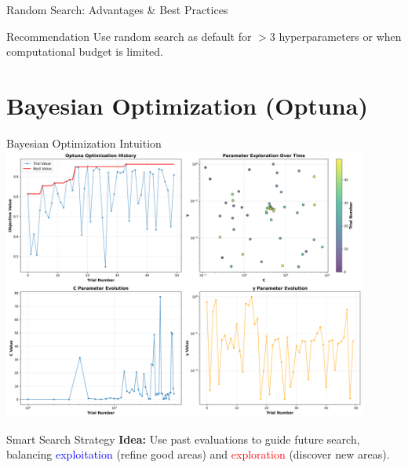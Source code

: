 \documentclass[8pt,aspectratio=1610]{beamer}
\begin{document}
\begin{frame}{Random Search: Advantages \& Best Practices}
\begin{alertblock}{Recommendation}
Use random search as default for $> 3$ hyperparameters or when computational budget is limited.
\end{alertblock}
\end{frame}


\section{Bayesian Optimization (Optuna)}

\begin{frame}{Bayesian Optimization Intuition}
\centering
\includegraphics[width=0.9\textwidth]{../figures/optuna_optimization_trace.png}

\vspace{0.3cm}

\begin{alertblock}{Smart Search Strategy}
\textbf{Idea:} Use past evaluations to guide future search, balancing \textcolor{blue}{exploitation} (refine good areas) and \textcolor{red}{exploration} (discover new areas).
\end{alertblock}
\end{frame}
\end{document}
